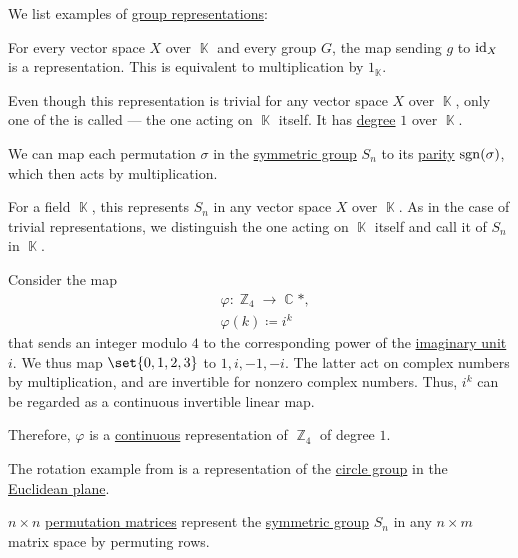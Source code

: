 \begin{example}\label{ex:def:group_representation}
  We list examples of \hyperref[def:group_representation]{group representations}:
  \begin{thmenum}
     For every vector space \( X \) over \( \BbbK \) and every group \( G \), the map sending \( g \) to \( \operatorname{id}_X \) is a representation. This is equivalent to multiplication by \( 1_\BbbK \).

    Even though this representation is trivial for any vector space \( X \) over \( \BbbK \), only one of the is called   --- the one acting on \( \BbbK \) itself. It has \hyperref[def:group_representation_degree]{degree} \( 1 \) over \( \BbbK \).

     We can map each permutation \( \sigma \) in the \hyperref[def:symmetric_group]{symmetric group} \( S_n \) to its \hyperref[def:permutation_parity]{parity} \( \operatorname{sgn}(\sigma) \), which then acts by multiplication.

    For a field \( \BbbK \), this represents \( S_n \) in any vector space \( X \) over \( \BbbK \). As in the case of trivial representations, we distinguish the one acting on \( \BbbK \) itself and call it   of \( S_n \) in \( \BbbK \).

     Consider the map
    \begin{equation*}
      \begin{aligned}
        &\varphi: \BbbZ_4 \to \BbbC*, \\
        &\varphi(k) \coloneqq i^k
      \end{aligned}
    \end{equation*}
    that sends an integer modulo \( 4 \) to the corresponding power of the \hyperref[def:complex_numbers]{imaginary unit} \( i \). We thus map \( \set{ 0, 1, 2, 3 } \) to \( 1, i, -1, -i \). The latter act on complex numbers by multiplication, and are invertible for nonzero complex numbers. Thus, \( i^k \) can be regarded as a continuous invertible linear map.

    Therefore, \( \varphi \) is a \hyperref[def:continuous_group_representation]{continuous} representation of \( \BbbZ_4 \) of degree \( 1 \).

     The rotation example from  is a representation of the \hyperref[def:circle_group]{circle group} in the \hyperref[def:euclidean_plane]{Euclidean plane}.

     \( n \times n \) \hyperref[def:elementary_matrix/permutation]{permutation matrices} represent the \hyperref[def:symmetric_group]{symmetric group} \( S_n \) in any \( n \times m \) matrix space by permuting rows.
  \end{thmenum}
\end{example}

